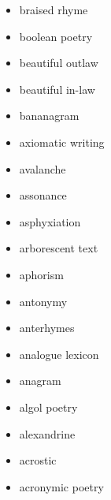 \begin{multicols}{3}
\begin{itemize}
  \item braised rhyme
  \item boolean poetry
  \item beautiful outlaw
  \item beautiful in-law
  \item bananagram
  \item axiomatic writing
  \item avalanche
  \item assonance
  \item asphyxiation
  \item arborescent text
  \item aphorism
  \item antonymy
  \item anterhymes
  \item analogue lexicon
  \item anagram
  \item algol poetry
  \item alexandrine
  \item acrostic
  \item acronymic poetry
\end{itemize}
\end{multicols}
